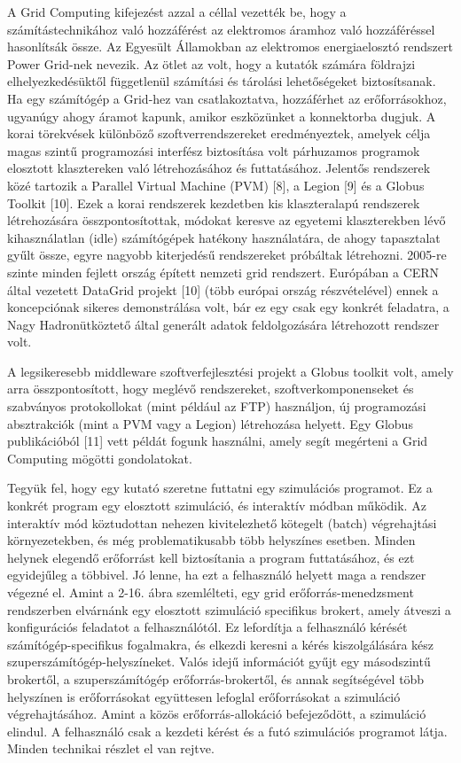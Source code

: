 \documentclass[
]{article}
\begin{document}
A Grid Computing kifejezést azzal a céllal vezették be, hogy a
számítástechnikához való hozzáférést az elektromos áramhoz való
hozzáféréssel hasonlítsák össze. Az Egyesült Államokban az elektromos
energiaelosztó rendszert Power Grid-nek nevezik. Az ötlet az volt, hogy
a kutatók számára földrajzi elhelyezkedésüktől függetlenül számítási és
tárolási lehetőségeket biztosítsanak. Ha egy számítógép a Grid-hez van
csatlakoztatva, hozzáférhet az erőforrásokhoz, ugyanúgy ahogy áramot
kapunk, amikor eszközünket a konnektorba dugjuk. A korai törekvések
különböző szoftverrendszereket eredményeztek, amelyek célja magas szintű
programozási interfész biztosítása volt párhuzamos programok elosztott
klasztereken való létrehozásához és futtatásához. Jelentős rendszerek
közé tartozik a Parallel Virtual Machine (PVM) {[}8{]}, a Legion {[}9{]}
és a Globus Toolkit {[}10{]}. Ezek a korai rendszerek kezdetben kis
klaszteralapú rendszerek létrehozására összpontosítottak, módokat
keresve az egyetemi klaszterekben lévő kihasználatlan (idle)
számítógépek hatékony használatára, de ahogy tapasztalat gyűlt össze,
egyre nagyobb kiterjedésű rendszereket próbáltak létrehozni. 2005-re
szinte minden fejlett ország épített nemzeti grid rendszert. Európában a
CERN által vezetett DataGrid projekt {[}10{]} (több európai ország
részvételével) ennek a koncepciónak sikeres demonstrálása volt, bár ez
egy csak egy konkrét feladatra, a Nagy Hadronütköztető által generált
adatok feldolgozására létrehozott rendszer volt.

A legsikeresebb middleware szoftverfejlesztési projekt a Globus toolkit
volt, amely arra összpontosított, hogy meglévő rendszereket,
szoftverkomponenseket és szabványos protokollokat (mint például az FTP)
használjon, új programozási absztrakciók (mint a PVM vagy a Legion)
létrehozása helyett. Egy Globus publikációból {[}11{]} vett példát
fogunk használni, amely segít megérteni a Grid Computing mögötti
gondolatokat.

Tegyük fel, hogy egy kutató szeretne futtatni egy szimulációs programot.
Ez a konkrét program egy elosztott szimuláció, és interaktív módban
működik. Az interaktív mód köztudottan nehezen kivitelezhető kötegelt
(batch) végrehajtási környezetekben, és még problematikusabb több
helyszínes esetben. Minden helynek elegendő erőforrást kell biztosítania
a program futtatásához, és ezt egyidejűleg a többivel. Jó lenne, ha ezt
a felhasználó helyett maga a rendszer végezné el. Amint a 2-16. ábra
szemlélteti, egy grid erőforrás-menedzsment rendszerben elvárnánk egy
elosztott szimuláció specifikus brokert, amely átveszi a konfigurációs
feladatot a felhasználótól. Ez lefordítja a felhasználó kérését
számítógép-specifikus fogalmakra, és elkezdi keresni a kérés
kiszolgálására kész szuperszámítógép-helyszíneket. Valós idejű
információt gyűjt egy másodszintű brokertől, a szuperszámítógép
erőforrás-brokertől, és annak segítségével több helyszínen is
erőforrásokat együttesen lefoglal erőforrásokat a szimuláció
végrehajtásához. Amint a közös erőforrás-allokáció befejeződött, a
szimuláció elindul. A felhasználó csak a kezdeti kérést és a futó
szimulációs programot látja. Minden technikai részlet el van rejtve.
\end{document}
